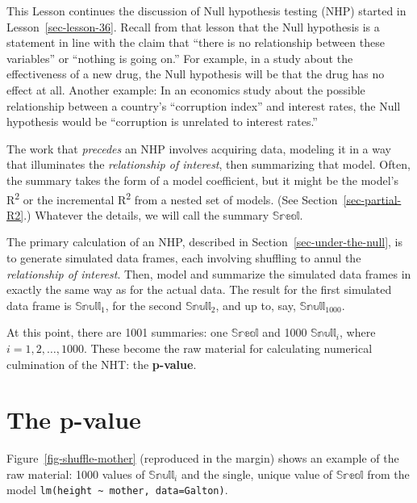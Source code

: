 \documentclass[
  letterpaper,
  DIV=11,
  numbers=noendperiod,
  oneside]{scrreprt}
\newcommand{\Ptest}{\mathbb{P}}
\newcommand{\Ntest}{\mathbb{N}}
\newcommand{\given}{\ |\!\!|\  }
\begin{document}
\[\newcommand{\Ptest}{\mathbb{P}}
\newcommand{\Ntest}{\mathbb{N}}
\newcommand{\given}{\ |\!\!|\  }\]

This Lesson continues the discussion of Null hypothesis testing (NHP)
started in Lesson~\ref{sec-lesson-36}. Recall from that lesson that the
Null hypothesis is a statement in line with the claim that ``there is no
relationship between these variables'' or ``nothing is going on.'' For
example, in a study about the effectiveness of a new drug, the Null
hypothesis will be that the drug has no effect at all. Another example:
In an economics study about the possible relationship between a
country's ``corruption index'' and interest rates, the Null hypothesis
would be ``corruption is unrelated to interest rates.''

The work that \emph{precedes} an NHP involves acquiring data, modeling
it in a way that illuminates the \emph{relationship of interest}, then
summarizing that model. Often, the summary takes the form of a model
coefficient, but it might be the model's R\textsuperscript{2} or the
incremental R\textsuperscript{2} from a nested set of models. (See
Section~\ref{sec-partial-R2}.) Whatever the details, we will call the
summary \(\mathbb{Sreal}\).

The primary calculation of an NHP, described in
Section~\ref{sec-under-the-null}, is to generate simulated data frames,
each involving shuffling to annul the \emph{relationship of interest}.
Then, model and summarize the simulated data frames in exactly the same
way as for the actual data. The result for the first simulated data
frame is \(\mathbb{Snull}_1\), for the second \(\mathbb{Snull}_2\), and
up to, say, \(\mathbb{Snull}_{1000}\).
{}

At this point, there are 1001 summaries: one \(\mathbb{Sreal}\) and 1000
\(\mathbb{Snull}_i\), where \(i=1, 2, \ldots, 1000\). These become the
raw material for calculating numerical culmination of the NHT: the
\textbf{p-value}.

\hypertarget{the-p-value}{%
\section{The p-value}\label{the-p-value}}

Figure~\ref{fig-shuffle-mother} (reproduced in the margin) shows an
example of the raw material: 1000 values of \(\mathbb{Snull}_i\) and the
single, unique value of \(\mathbb{Sreal}\) from the model
\texttt{lm(height\ \textasciitilde{}\ mother,\ data=Galton)}.
\end{document}
